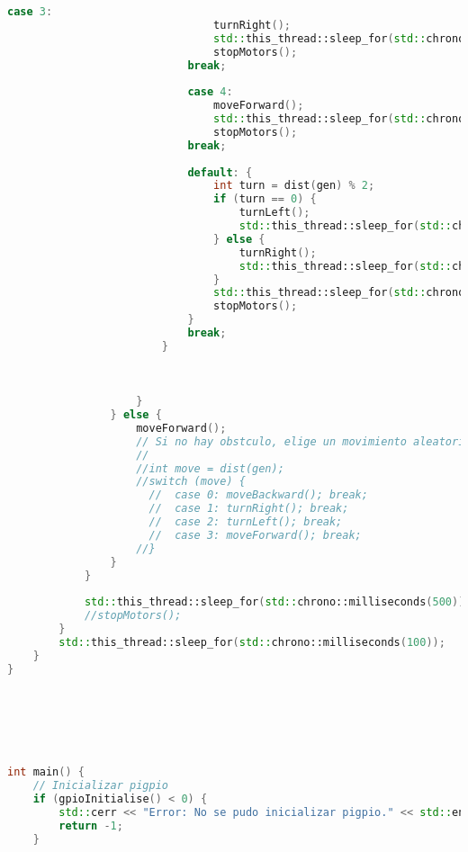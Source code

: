\begin{lstlisting}[language={C++}, caption={Primer ajuste de c\'odigo}, label={Script}]
                            case 3:
                                turnRight();
                                std::this_thread::sleep_for(std::chrono::seconds(7));
                                stopMotors();
                            break;
                            
                            case 4:
                                moveForward();
                                std::this_thread::sleep_for(std::chrono::seconds(2));
                                stopMotors();
                            break;
                            
                            default: {
                                int turn = dist(gen) % 2;
                                if (turn == 0) {
                                    turnLeft();
                                    std::this_thread::sleep_for(std::chrono::seconds(5));
                                } else {
                                    turnRight();
                                    std::this_thread::sleep_for(std::chrono::seconds(5));
                                }
                                std::this_thread::sleep_for(std::chrono::seconds(2));
                                stopMotors();
                            }
                            break;
                        }

                        
                        
                    }
                } else {
                    moveForward();
                    // Si no hay obstculo, elige un movimiento aleatorio
                    //
                    //int move = dist(gen);
                    //switch (move) {
                      //  case 0: moveBackward(); break;
                      //  case 1: turnRight(); break;
                      //  case 2: turnLeft(); break;
                      //  case 3: moveForward(); break;
                    //}
                }
            }
            
            std::this_thread::sleep_for(std::chrono::milliseconds(500));
            //stopMotors();
        }
        std::this_thread::sleep_for(std::chrono::milliseconds(100));
    }
}






int main() {
    // Inicializar pigpio
    if (gpioInitialise() < 0) {
        std::cerr << "Error: No se pudo inicializar pigpio." << std::endl;
        return -1;
    }


\end{lstlisting}

